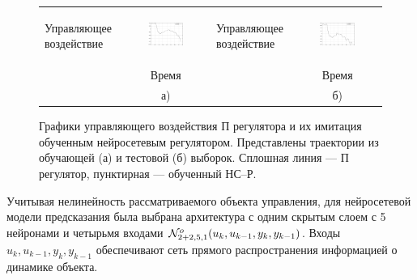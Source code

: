 \begin{figure}
\centering
\begin{tabular}{lclc}
  \begin{sideways}
    {\hspace{1cm}\small Управляющее воздействие}
  \end{sideways}
  &
  \includegraphics[width=0.45\textwidth,%
    totalheight=0.25\textheight]{moby_nnc_pretr_learn}
  &
  \begin{sideways}
    {\hspace{1cm}\small Управляющее воздействие}
  \end{sideways}
  &
  \includegraphics[width=0.45\textwidth,%
    totalheight=0.25\textheight]{moby_nnc_pretr_test}
  \\
  & {\small Время} & & {\small Время}\\
  & а) & & б)\\
\end{tabular}
\caption{Графики управляющего воздействия П регулятора и их
имитация обученным нейросетевым регулятором.  Представлены траектории
из обучающей (а) и тестовой (б) выборок.  Сплошная линия ---
П регулятор, пунктирная --- обученный НС--Р.}
\label{fig:moby_nnc_pretr}
\end{figure}


Учитывая нелинейность рассматриваемого объекта управления, для
нейросетевой модели предсказания была выбрана архитектура с одним
скрытым слоем с 5 нейронами и четырьмя входами
$\mathcal{N}^o_{2+2,5,1}(u_k,u_{k-1},y_k,y_{k-1})$.  Входы
$u_k,u_{k-1},y_k,y_{k-1}$ обеспечивают сеть прямого распространения
информацией о динамике объекта.

